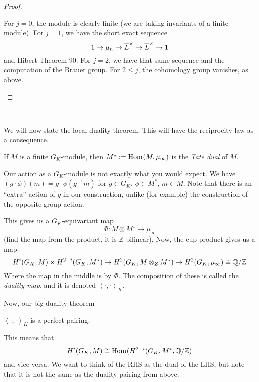 \begin{proof}
\begin{enumerate}[(1)]
			For \(j=0\), the module is clearly finite (we are taking
			invariants of a finite module).
			For \(j=1\), we have the short exact sequence
			\[
			1 \to \mu_{n} \to \overline{L}^{\times} \to 
			\overline{L}^{\times} \to 1
			\] 
			and Hibert Theorem 90.
			For \(j = 2\), we have that same sequence and the 
			computation of the Brauer group.
			For \(2 \leq j\), the cohomology group vanishes, 
			as above.

	\end{enumerate}
\end{proof}

-----

We will now state the local duality theorem. 
This will have the reciprocity law as a consequence.

\begin{definition}
	If \(M\) is a finite \(G_{K}\)-module, then \(M^{\star} :=
	\operatorname{Hom}_{} (M,\mu_{\infty})\) is the \textit{Tate dual} of \(M\).
\end{definition}

Our action as a \(G_{K}\)-module is not exactly what you would expect.
We have  \((g \cdot \phi)(m) = g \cdot \phi(g^{-1} m)\) for \(g \in G_{K}\),
\(\phi \in M^{*}\), \(m \in M\).
Note that there is an ``extra'' action of \(g\) in our construction,
unlike (for example) the construction of the opposite group action.

This gives us a \(G_{K}\)-equivariant map  
\[
\Phi : M \otimes M^{\star} \to \mu_{\infty}
\] 
(find the map from the product, it is \(\mathbb{Z}\)-bilinear).
Now, the cup product gives us a map
\[
	H^{i}(G_{K},M) \times H^{2-i}(G_{K},M^{\star})
	\to H^{2}(G_{K}, M \otimes_{Z} M^{\star})
	\to H^{2}(G_{K}, \mu_{\infty})
	\cong \mathbb{Q} / \mathbb{Z}
\] 
Where the map in the middle is by \(\Phi\).
The composition of these is called the \textit{duality map}, and it is 
denoted \(\left<\cdot,\cdot \right>_{K}\).

Now, our big duality theorem

\begin{theorem}
	\(\left<\cdot,\cdot\right>_{K}\) is a perfect pairing.
\end{theorem}

This means that 
\[
	H^{i}(G_{K},M) \cong \operatorname{Hom}_{} (H^{2-i}(G_{K},M^{\star},\mathbb{Q} / \mathbb{Z})
\] 
and vice versa.
We want to think of the RHS as the dual of the LHS, but note that it 
is not the same as the duality pairing from above. 





